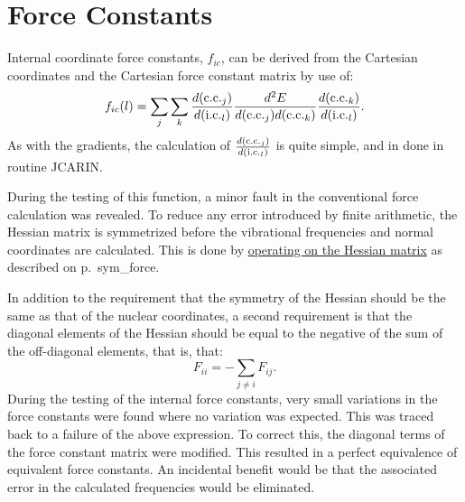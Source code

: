 \section{Force Constants}\label{fc}
Internal coordinate force constants, $f_{ic}$, can be derived from the
Cartesian coordinates and the Cartesian force constant matrix by use of:
$$
f_{ic}(l) = \sum_j\sum_k
\frac{d({\rm c.c.}_j)}{d({\rm i.c.}_l)}
\frac{d^2E}{d({\rm c.c.}_j)d({\rm c.c.}_k)}
\frac{d({\rm c.c.}_k)}{d({\rm i.c.}_l)}.
$$
As with the gradients, the calculation of $\frac{d({\rm c.c.}_j)}{d({\rm
i.c.}_l)}$ is quite simple, and in done in routine JCARIN.

During the testing of this function, a minor fault in the conventional
force calculation was revealed.  To reduce any error introduced by
finite arithmetic, the Hessian matrix is symmetrized before the
vibrational frequencies and normal coordinates are calculated.  This is
done by \hyperref[pageref]{operating on the Hessian matrix}{ as
described on p.~}{}{sym_force}.

In addition to the requirement that the symmetry of the Hessian should be the
same as that of the nuclear coordinates, a second requirement is that the
diagonal elements of the Hessian should be equal to the negative of the sum of
the off-diagonal elements, that is, that:
$$
F_{ii} = -\sum_{j\ne i}F_{ij}.
$$
During the testing of the internal force constants, very small variations in
the force constants were found where no variation was expected.  This was
traced back to a failure of the above expression.  To correct this, the
diagonal terms of the force constant matrix were modified.  This resulted in a
perfect equivalence of equivalent force constants.  An incidental benefit would
be that the associated error in the calculated frequencies would be eliminated.
